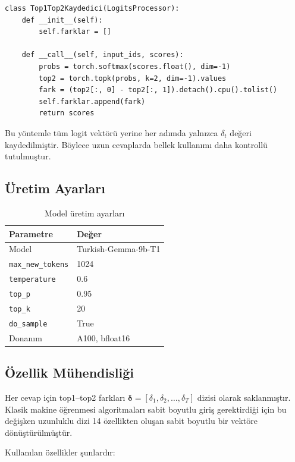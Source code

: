 \documentclass[conference]{IEEEtran}
\begin{document}
\begin{lstlisting}
class Top1Top2Kaydedici(LogitsProcessor):
    def __init__(self):
        self.farklar = []

    def __call__(self, input_ids, scores):
        probs = torch.softmax(scores.float(), dim=-1)
        top2 = torch.topk(probs, k=2, dim=-1).values
        fark = (top2[:, 0] - top2[:, 1]).detach().cpu().tolist()
        self.farklar.append(fark)
        return scores
\end{lstlisting}

Bu yöntemle tüm logit vektörü yerine her adımda yalnızca $\delta_t$ değeri
kaydedilmiştir. Böylece uzun cevaplarda bellek kullanımı daha kontrollü
tutulmuştur.

\subsection{Üretim Ayarları}

\begin{table}[H]
  \centering
  \caption{Model üretim ayarları}
  \label{tab:params}
  \begin{tabular}{ll}
    \toprule
    \textbf{Parametre} & \textbf{Değer} \\
    \midrule
    Model & Turkish-Gemma-9b-T1 \\
    \texttt{max\_new\_tokens} & 1024 \\
    \texttt{temperature} & 0.6 \\
    \texttt{top\_p} & 0.95 \\
    \texttt{top\_k} & 20 \\
    \texttt{do\_sample} & True \\
    Donanım & A100, bfloat16 \\
    \bottomrule
  \end{tabular}
\end{table}

\subsection{Özellik Mühendisliği}

Her cevap için top1--top2 farkları
$\boldsymbol{\delta}=[\delta_1,\delta_2,\ldots,\delta_T]$ dizisi olarak
saklanmıştır. Klasik makine öğrenmesi algoritmaları sabit boyutlu giriş
gerektirdiği için bu değişken uzunluklu dizi 14 özellikten oluşan sabit boyutlu
bir vektöre dönüştürülmüştür.

Kullanılan özellikler şunlardır:
\end{document}
